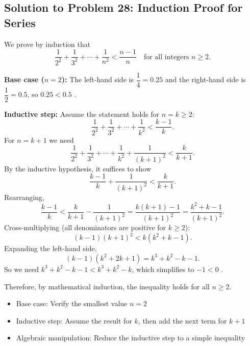 \subsection{Solution to Problem 28: Induction Proof for Series}

\begin{solution}
We prove by induction that
\[
\frac{1}{2^2} + \frac{1}{3^2} + \cdots + \frac{1}{n^2} < \frac{n-1}{n}
\quad \text{for all integers } n \ge 2.
\]

\textbf{Base case ($n = 2$):} The left-hand side is $\dfrac{1}{4} = 0.25$ and the right-hand side is $\dfrac{1}{2} = 0.5$, so $0.25 < 0.5$ \checkmark.

\textbf{Inductive step:} Assume the statement holds for $n = k \ge 2$:
\[
\frac{1}{2^2} + \frac{1}{3^2} + \cdots + \frac{1}{k^2} < \frac{k-1}{k}.
\]
For $n = k+1$ we need
\[
\frac{1}{2^2} + \frac{1}{3^2} + \cdots + \frac{1}{k^2} + \frac{1}{(k+1)^2} < \frac{k}{k+1}.
\]
By the inductive hypothesis, it suffices to show
\[
\frac{k-1}{k} + \frac{1}{(k+1)^2} < \frac{k}{k+1}.
\]
Rearranging,
\[
\frac{k-1}{k} < \frac{k}{k+1} - \frac{1}{(k+1)^2}
= \frac{k(k+1) - 1}{(k+1)^2}
= \frac{k^2 + k - 1}{(k+1)^2}.
\]
Cross-multiplying (all denominators are positive for $k \ge 2$):
\[
(k-1)(k+1)^2 < k(k^2 + k - 1).
\]
Expanding the left-hand side,
\[
(k-1)(k^2 + 2k + 1) = k^3 + k^2 - k - 1.
\]
So we need $k^3 + k^2 - k - 1 < k^3 + k^2 - k$, which simplifies to $-1 < 0$ \checkmark.

Therefore, by mathematical induction, the inequality holds for all $n \ge 2$.
\end{solution}

\begin{takeaways}
\begin{itemize}
    \item Base case: Verify the smallest value $n = 2$
    \item Inductive step: Assume the result for $k$, then add the next term for $k+1$
    \item Algebraic manipulation: Reduce the inductive step to a simple inequality
\end{itemize}
\end{takeaways}
